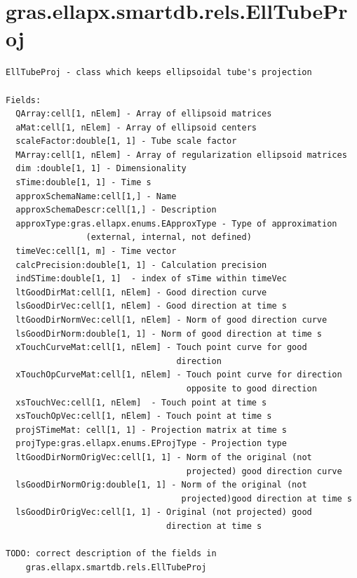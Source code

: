 \documentclass[letterpaper,10pt,english]{sphinxmanual}
\begin{document}
\section{gras.ellapx.smartdb.rels.EllTubeProj}
\label{chap_func:gras-ellapx-smartdb-rels-elltubeproj}
\begin{Verbatim}[commandchars=\\\{\}]
EllTubeProj - class which keeps ellipsoidal tube's projection

Fields:
  QArray:cell[1, nElem] - Array of ellipsoid matrices
  aMat:cell[1, nElem] - Array of ellipsoid centers
  scaleFactor:double[1, 1] - Tube scale factor
  MArray:cell[1, nElem] - Array of regularization ellipsoid matrices
  dim :double[1, 1] - Dimensionality
  sTime:double[1, 1] - Time s
  approxSchemaName:cell[1,] - Name
  approxSchemaDescr:cell[1,] - Description
  approxType:gras.ellapx.enums.EApproxType - Type of approximation
                (external, internal, not defined)
  timeVec:cell[1, m] - Time vector
  calcPrecision:double[1, 1] - Calculation precision
  indSTime:double[1, 1]  - index of sTime within timeVec
  ltGoodDirMat:cell[1, nElem] - Good direction curve
  lsGoodDirVec:cell[1, nElem] - Good direction at time s
  ltGoodDirNormVec:cell[1, nElem] - Norm of good direction curve
  lsGoodDirNorm:double[1, 1] - Norm of good direction at time s
  xTouchCurveMat:cell[1, nElem] - Touch point curve for good
                                  direction
  xTouchOpCurveMat:cell[1, nElem] - Touch point curve for direction
                                    opposite to good direction
  xsTouchVec:cell[1, nElem]  - Touch point at time s
  xsTouchOpVec:cell[1, nElem] - Touch point at time s
  projSTimeMat: cell[1, 1] - Projection matrix at time s
  projType:gras.ellapx.enums.EProjType - Projection type
  ltGoodDirNormOrigVec:cell[1, 1] - Norm of the original (not
                                    projected) good direction curve
  lsGoodDirNormOrig:double[1, 1] - Norm of the original (not
                                   projected)good direction at time s
  lsGoodDirOrigVec:cell[1, 1] - Original (not projected) good
                                direction at time s

TODO: correct description of the fields in
    gras.ellapx.smartdb.rels.EllTubeProj
\end{Verbatim}
\end{document}
